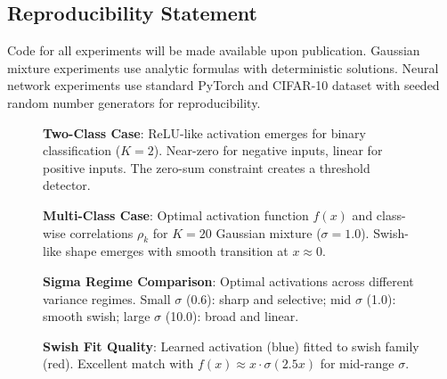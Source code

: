 \documentclass{article}
\begin{document}
\subsection*{Reproducibility Statement}

Code for all experiments will be made available upon publication. Gaussian mixture experiments use analytic formulas with deterministic solutions. Neural network experiments use standard PyTorch and CIFAR-10 dataset with seeded random number generators for reproducibility.




\begin{figure}[t]
\centering
\caption{\textbf{Two-Class Case}: ReLU-like activation emerges for binary classification ($K=2$). Near-zero for negative inputs, linear for positive inputs. The zero-sum constraint creates a threshold detector.}
\label{fig:two_class}
\end{figure}

\begin{figure}[t]
\centering
\caption{\textbf{Multi-Class Case}: Optimal activation function $f(x)$ and class-wise correlations $\rho_k$ for $K=20$ Gaussian mixture ($\sigma=1.0$). Swish-like shape emerges with smooth transition at $x \approx 0$.}
\label{fig:multi_class}
\end{figure}

\begin{figure}[t]
\centering
\caption{\textbf{Sigma Regime Comparison}: Optimal activations across different variance regimes. Small $\sigma$ (0.6): sharp and selective; mid $\sigma$ (1.0): smooth swish; large $\sigma$ (10.0): broad and linear.}
\label{fig:sigma_regimes}
\end{figure}

\begin{figure}[t]
\centering
\caption{\textbf{Swish Fit Quality}: Learned activation (blue) fitted to swish family (red). Excellent match with $f(x) \approx x \cdot \sigma(2.5x)$ for mid-range $\sigma$.}
\label{fig:swish_fit}
\end{figure}
\end{document}
